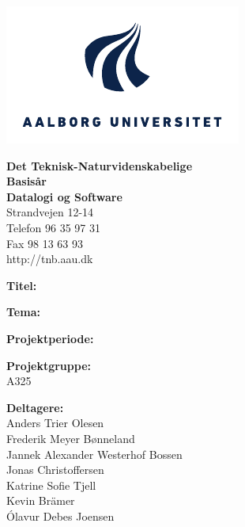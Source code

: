 \begin{titlepage}
	\begin{minipage}{0.40\textwidth}
		\includegraphics[width=\textwidth]{Billeder/aau-logo-new.pdf}
	\end{minipage}
	\hfill
	\begin{minipage}{0.40\textwidth}
		{\sf\small \textbf{Det Teknisk-Naturvidenskabelige\\ Basis{\aa}r }}\\
		{\sf\small \textbf{Datalogi og Software}} \\
		{\sf\small Strandvejen 12-14} \\
		{\sf\small Telefon 96 35 97 31} \\
		{\sf\small Fax 98 13 63 93} \\
		{\sf\small http://tnb.aau.dk}
	\end{minipage}

	\begin{minipage}{0.4\textwidth}
		\begin{description}
			\vspace{1cm}
			\item {\bf Titel:}\\ \rtitle
			\item {\bf Tema:}\\ \rtheme 
			\item {\bf Projektperiode:}\\ \rperiod
			\item {\bf Projektgruppe:}\\ A325
			\item {\bf Deltagere:}\\
			Anders Trier Olesen\\
			Frederik Meyer Bønneland\\
			Jannek Alexander Westerhof Bossen\\
			Jonas Christoffersen\\
			Katrine Sofie Tjell\\
			Kevin Brämer\\
			Ólavur Debes Joensen\\


\end{description}
\end{minipage}
\end{titlepage}
